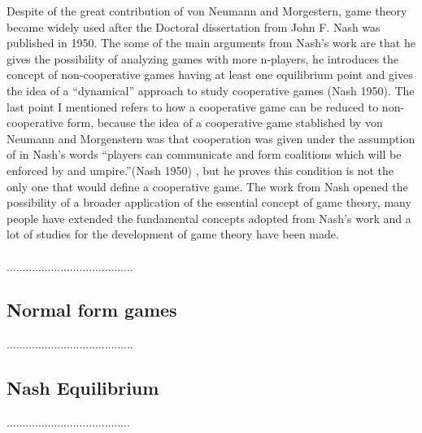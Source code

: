 \documentclass{article}
\begin{document}
Despite of the great contribution of von Neumann and Morgestern, game theory became widely used after the Doctoral dissertation from John F. Nash was published in 1950. The some of the main arguments from Nash’s work are that he gives the possibility of analyzing games with more n-players, he introduces the concept of non-cooperative games having at least one equilibrium point and gives the idea of a “dynamical” approach to study cooperative games (Nash 1950). The last point I mentioned refers to how a cooperative game can be reduced to non-cooperative form, because the idea of a cooperative game stablished by von Neumann and Morgenstern was that cooperation was given under the assumption of in Nash’s words “players can communicate and form coalitions which will be enforced by and umpire.”(Nash 1950) , but he proves this condition is not the only one that would define a cooperative game. The work from Nash opened the possibility of a broader application of the essential concept of game theory, many people have extended the fundamental concepts adopted from Nash’s work and a lot of studies for the development of game theory have been made.
\\\\........................................
\subsection{Normal form games}\label{second_section}
........................................

\subsection{Nash Equilibrium}\label{third_section}

.......................................
\end{document}
